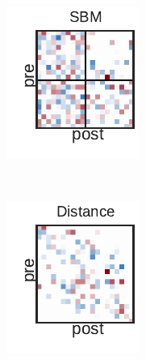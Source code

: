 \begin{figure}[t!]
\begin{subfigure}[b]{1.10in}
  \end{subfigure}
  ~
  \begin{subfigure}[b]{1.10in}
    \centering
    \includegraphics[width=\textwidth]{figures/ch3/SBM-Gaussian.pdf}
  \end{subfigure}
  ~
  \begin{subfigure}[b]{1.10in}
    \centering
    \includegraphics[width=\textwidth]{figures/ch3/Distance-Gaussian.pdf}

\end{subfigure}
\end{figure}
